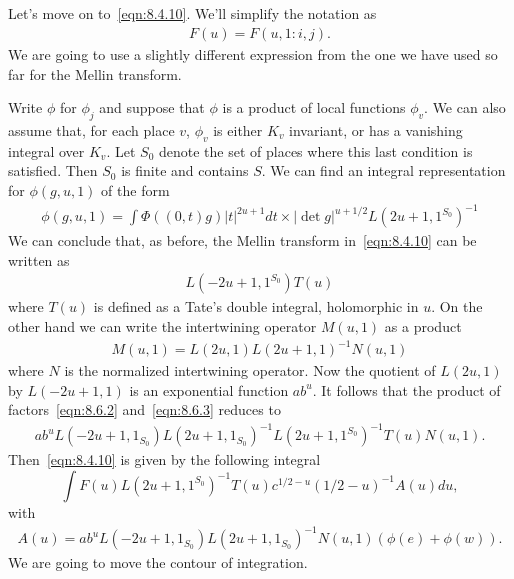 \subsection{}
Let's move on to~\eqref{eqn:8.4.10}.
We'll simplify the notation as
\begin{align*}
    F(u) = F(u, 1:i, j).
\end{align*}
We are going to use a slightly different expression from the one we have used so far for the Mellin transform.

Write $\phi$ for $\phi_j$ and suppose that $\phi$ is a product of local functions $\phi_v$.
We can also assume that, for each place $v$, $\phi_v$ is either $K_v$ invariant, or has a vanishing integral over $K_v$.
Let $S_0$ denote the set of places where this last condition is satisfied.
Then $S_0$ is finite and contains $S$. 
We can find an integral representation for $\phi(g, u, 1)$ of the form
\begin{align}
    \phi(g, u, 1) = \int \Phi((0, t)g) |t|^{2u+1} dt \times |\det g|^{u+1/2} L(2u+1, 1^{S_0})^{-1}
\end{align}
We can conclude that, as before, the Mellin transform in~\eqref{eqn:8.4.10} can be written as
\begin{align}
    \label{eqn:8.6.2}
    L(-2u+1, 1^{S_0}) T(u)
\end{align}
where $T(u)$ is defined as a Tate's double integral, holomorphic in $u$.
On the other hand we can write the intertwining operator $M(u, 1)$ as a product
\begin{align}
    \label{eqn:8.6.3}
    M(u, 1) = L(2u, 1) L(2u+1, 1)^{-1}N(u, 1)
\end{align}
where $N$ is the normalized intertwining operator.
Now the quotient of $L(2u, 1)$ by $L(-2u+1, 1)$ is an exponential function $ab^u$.
It follows that the product of factors~\eqref{eqn:8.6.2} and~\eqref{eqn:8.6.3} reduces to
\begin{align}
    ab^u L(-2u + 1, 1_{S_0}) L(2u+1, 1_{S_0})^{-1} L(2u+1, 1^{S_0})^{-1} T(u)N(u, 1).
\end{align}
Then~\eqref{eqn:8.4.10} is given by the following integral
\begin{equation}
    \int F(u) L(2u+1, 1^{S_0})^{-1} T(u) c^{1/2-u} (1/2-u)^{-1} A(u) du,
\end{equation}
with
\begin{align*}
    A(u) = ab^{u}L(-2u+1, 1_{S_0}) L(2u+1, 1_{S_0})^{-1} N(u, 1)(\phi(e) + \phi(w)).
\end{align*}
We are going to move the contour of integration.
